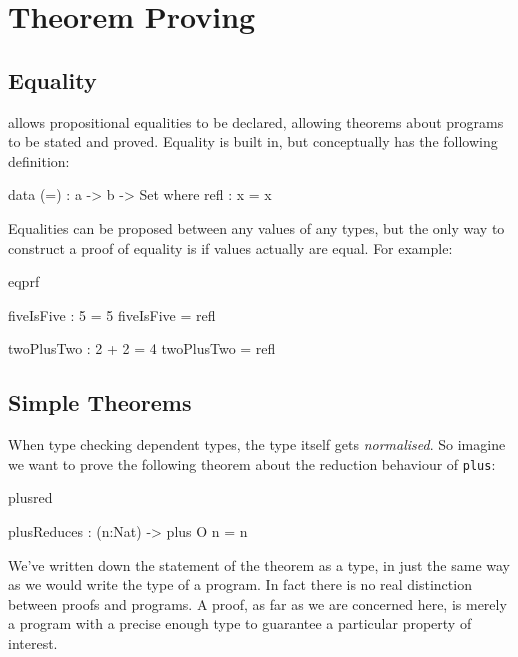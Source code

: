 \section{Theorem Proving}

\subsection{Equality}

\Idris{} allows propositional equalities to be declared, allowing theorems about
programs to be stated and proved. Equality is built in, but conceptually has
the following definition:

\begin{SaveVerbatim}{}

data (=) : a -> b -> Set where
   refl : x = x

\end{SaveVerbatim}
\useverb{}

\noindent
Equalities can be proposed between any values of any types, but the only way to
construct a proof of equality is if values actually are equal. For example:

\begin{SaveVerbatim}{eqprf}

fiveIsFive : 5 = 5
fiveIsFive = refl

twoPlusTwo : 2 + 2 = 4
twoPlusTwo = refl

\end{SaveVerbatim}

\subsection{Simple Theorems}

When type checking dependent types, the type itself gets \emph{normalised}. So imagine
we want to prove the following theorem about the reduction behaviour of \texttt{plus}:

\begin{SaveVerbatim}{plusred}

plusReduces : (n:Nat) -> plus O n = n

\end{SaveVerbatim}

\noindent
We've written down the statement of the theorem as a type, in just the same way
as we would write the type of a program. In fact there is no real distinction
between proofs and programs. A proof, as far as we are concerned here, is
merely a program with a precise enough type to guarantee a particular property
of interest.

